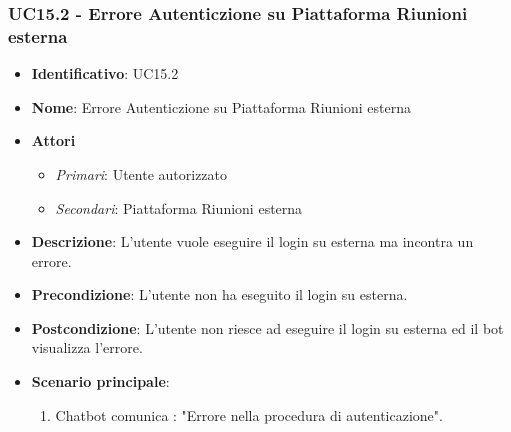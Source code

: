 \subsubsection{UC15.2 - Errore Autenticzione su Piattaforma Riunioni esterna}
\begin{itemize}
	\item \textbf{Identificativo}: UC15.2
	\item \textbf{Nome}: Errore Autenticzione su Piattaforma Riunioni esterna
	\item \textbf{Attori}
	\begin{itemize} 
		\item \textit{Primari}: Utente autorizzato
		\item \textit{Secondari}: Piattaforma Riunioni esterna
	\end{itemize}
	\item \textbf{Descrizione}: L'utente vuole eseguire il login su  esterna ma incontra un errore.
	\item \textbf{Precondizione}: L'utente non ha eseguito il login su  esterna.
	\item \textbf{Postcondizione}: L'utente non riesce ad eseguire il login su  esterna ed il bot visualizza l'errore.
	\item \textbf{Scenario principale}: \begin{enumerate}
		\item Chatbot comunica : "Errore nella procedura di autenticazione". 
	\end{enumerate}
\end{itemize}

